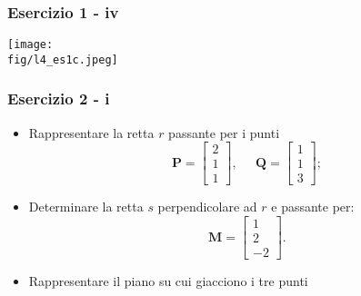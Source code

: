 \documentclass{beamer}
\newcommand{\fig}{./figures} %
\begin{document}
%
\begin{frame}[fragile]
\frametitle{Esercizio 1 - iv}
\texttt{[image: \\fig/l4\_es1c.jpeg]}

\end{frame}
%
%
\begin{frame}
\frametitle{Esercizio 2 - i}
\begin{itemize}
\item Rappresentare la retta $r$ passante per i punti
\begin{displaymath}
\mathbf{P}=\begin{bmatrix}2\\1\\1 \end{bmatrix},\;\;\;\;\;
\mathbf{Q}=\begin{bmatrix}1\\1\\3 \end{bmatrix};
\end{displaymath}
\item Determinare la retta $s$ perpendicolare ad $r$ e passante per:
\begin{displaymath}
\mathbf{M}=\begin{bmatrix}1\\2\\-2 \end{bmatrix}.
\end{displaymath}
\item Rappresentare il piano su cui giacciono i tre punti
\end{itemize}
\end{frame}
\end{document}
